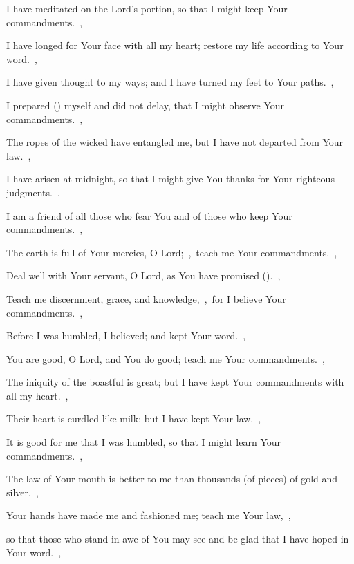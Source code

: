 \documentclass[12pt,twoside,a5paper]{article}
\begin{document}
\begin{normalparskip}
   I have meditated on the Lord's portion, so that I might keep Your commandments.~\sep


  I have longed for Your face with all my heart; restore my life according to Your word.~\sep

  I have given thought to my ways; and I have turned my feet to Your paths.~\sep

  I prepared () myself and did not delay, that I might observe Your commandments.~\sep

  The ropes of the wicked have entangled me, but I have not departed from Your law.~\sep

  I have arisen at midnight, so that I might give You thanks for Your righteous judgments.~\sep

  I am a friend of all those who fear You and of those who keep Your commandments.~\sep

  The earth is full of Your mercies, O Lord;~\sep\ teach me Your commandments.~\sep

   Deal well with Your servant, O Lord, as You have promised ().~\sep


  Teach me discernment, grace, and knowledge,~\sep\ for I believe Your commandments.~\sep

  Before I was humbled, I believed; and kept Your word.~\sep

  You are good, O Lord, and You do good; teach me Your commandments.~\sep

  The iniquity of the boastful is great; but I have kept Your commandments with all my heart.~\sep

  Their heart is curdled like milk; but I have kept Your law.~\sep

  It is good for me that I was humbled, so that I might learn Your commandments.~\sep

  The law of Your mouth is better to me than thousands (of pieces) of gold and silver.~\sep

   Your hands have made me and fashioned me; teach me Your law,~\sep


  so that those who stand in awe of You may see and be glad that I have hoped in Your word.~\sep


\end{normalparskip}
\end{document}
